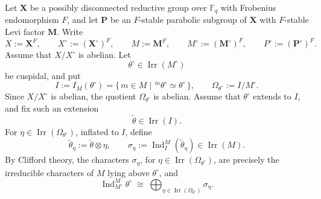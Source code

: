 \documentclass{amsart}
\theoremstyle{plain}
\numberwithin{equation}{section}
\theoremstyle{definition}
\newcommand{\Ind}{\operatorname{Ind}}
\newcommand{\Irr}{\operatorname{Irr}}
\newcommand{\bP}{\mathbf{P}}
\newcommand{\bM}{\mathbf{M}}
\newcommand{\bX}{\mathbf{X}}
\newcommand{\F}{\mathbb{F}}
\begin{document}
Let $\bX$ be a possibly disconnected reductive group over $\F_q$ with Frobenius
endomorphism $F$, and let $\bP$ be an $F$-stable parabolic subgroup of $\bX$ with
$F$-stable Levi factor $\bM$. Write
\[
X:=\bX^F,\qquad X^\circ:=(\bX^\circ)^F,\qquad
M:=\bM^F,\qquad M^\circ:=(\bM^\circ)^F,\qquad P^\circ:=(\bP^\circ)^F.
\]
Assume that \(X/X^\circ\) is abelian. Let
\[
\theta^\circ\in \Irr(M^\circ)
\]
be cuspidal, and put
\[
I:=I_M(\theta^\circ)
=
\{\,m\in M \mid {}^{\,m}\theta^\circ\simeq \theta^\circ\,\},
\qquad
\Omega_{\theta^\circ}:=I/M^\circ.
\]
Since \(X/X^\circ\) is abelian, the quotient \(\Omega_{\theta^\circ}\) is abelian.
Assume that \(\theta^\circ\) extends to \(I\), and fix such an extension
\[
\widetilde\theta\in \Irr(I).
\]
For \(\eta\in \Irr(\Omega_{\theta^\circ})\), inflated to \(I\), define
\[
\widetilde\theta_\eta:=\widetilde\theta\otimes \eta,
\qquad
\sigma_\eta:=\Ind_I^M(\widetilde\theta_\eta)\in \Irr(M).
\]
By Clifford theory, the characters \(\sigma_\eta\), for \(\eta\in \Irr(\Omega_{\theta^\circ})\),
are precisely the irreducible characters of \(M\) lying above \(\theta^\circ\), and
\[
\Ind_{M^\circ}^{M}\theta^\circ
\;\cong\;
\bigoplus_{\eta\in \Irr(\Omega_{\theta^\circ})}\sigma_\eta.
\]
\end{document}
